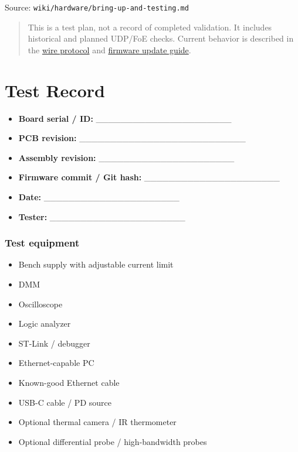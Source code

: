 \documentclass[10pt,a4paper,oneside]{report}
\providecommand{\tightlist}{\setlength{\itemsep}{1pt}\setlength{\parskip}{1pt}}
\begin{document}
{\small\color{MGSMuted}Source: \nolinkurl{wiki/hardware/bring-up-and-testing.md}\par}\medskip

\begin{quote}
This is a test plan, not a record of completed validation. It includes historical and planned UDP/FoE checks. Current behavior is described in the \hyperref[wiki-protocols-wire-protocol--magnecko-sense-wire-protocol]{wire protocol} and \hyperref[wiki-firmware-firmware-updates--application-firmware-updates-and-ab-recovery]{firmware update guide}.
\end{quote}

\section{Test Record}\label{wiki-hardware-bring-up-and-testing--0-test-record}

\begin{itemize}
\tightlist
\item
  \textbf{Board serial / ID:} \_\_\_\_\_\_\_\_\_\_\_\_\_\_\_\_\_\_\_\_\_\_
\item
  \textbf{PCB revision:} \_\_\_\_\_\_\_\_\_\_\_\_\_\_\_\_\_\_\_\_\_\_\_\_\_\_\_
\item
  \textbf{Assembly revision:} \_\_\_\_\_\_\_\_\_\_\_\_\_\_\_\_\_\_\_\_\_\_
\item
  \textbf{Firmware commit / Git hash:} \_\_\_\_\_\_\_\_\_\_\_\_\_\_\_\_\_\_\_\_\_\_
\item
  \textbf{Date:} \_\_\_\_\_\_\_\_\_\_\_\_\_\_\_\_\_\_\_\_\_\_
\item
  \textbf{Tester:} \_\_\_\_\_\_\_\_\_\_\_\_\_\_\_\_\_\_\_\_\_\_
\end{itemize}

\subsubsection{Test equipment}\label{wiki-hardware-bring-up-and-testing--test-equipment}

\begin{itemize}
\tightlist
\item[$\square$]
  Bench supply with adjustable current limit
\item[$\square$]
  DMM
\item[$\square$]
  Oscilloscope
\item[$\square$]
  Logic analyzer
\item[$\square$]
  ST-Link / debugger
\item[$\square$]
  Ethernet-capable PC
\item[$\square$]
  Known-good Ethernet cable
\item[$\square$]
  USB-C cable / PD source
\item[$\square$]
  Optional thermal camera / IR thermometer
\item[$\square$]
  Optional differential probe / high-bandwidth probes
\end{itemize}
\end{document}
